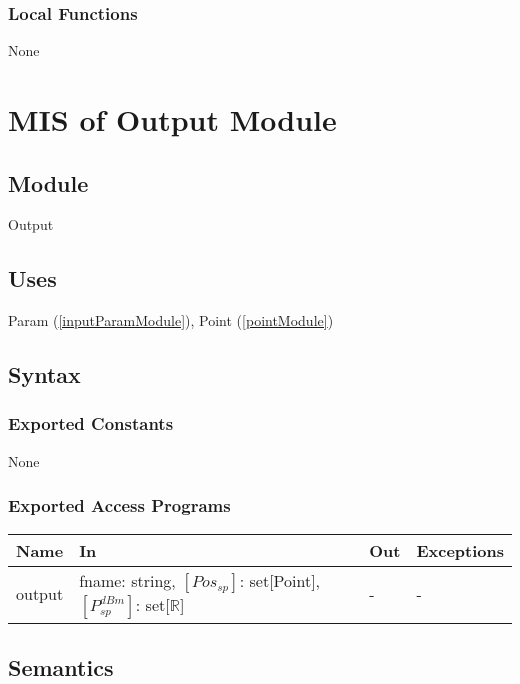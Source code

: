 \documentclass[12pt, titlepage]{article}
\begin{document}
\subsubsection{Local Functions}
None



\newpage
\section{MIS of Output Module} \label{outputModule}

\subsection{Module}

Output

\subsection{Uses}
Param (\autoref{inputParamModule}), Point (\autoref{pointModule})

\subsection{Syntax}

\subsubsection{Exported Constants} None

\subsubsection{Exported Access Programs}

\begin{center}
\begin{tabular}{p{3cm} p{3cm} p{3cm} p{3cm}}
\hline
\textbf{Name} & \textbf{In} & \textbf{Out} & \textbf{Exceptions} \\
\hline
output & fname: string, $[Pos_{sp}]$: set[Point], $[P_{sp}^{dBm}]$: set[$\mathbb{R}$] & - & - \\

\hline
\end{tabular}
\end{center}

\subsection{Semantics}
\end{document}

